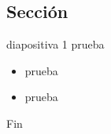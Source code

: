 \documentclass[10pt]{beamer}
\begin{document}
\subsection{Sección}
\begin{frame}{diapositiva 1}
prueba
        \begin{itemize}
            \item prueba
            \item prueba       
        \end{itemize}
\end{frame}








\begin{frame}

\textcolor{myNewColorA}{\Huge{\centerline{Fin}}}




\end{frame}
\end{document}
